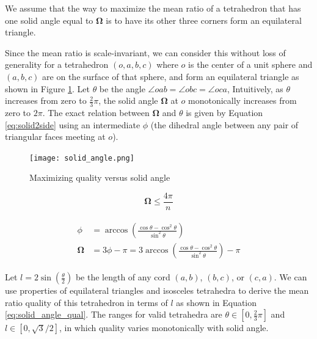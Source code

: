 We assume that the way to maximize the mean ratio of a tetrahedron
that has one solid angle equal to $\mathbf{\Omega}$ is to have
its other three corners form an equilateral triangle.

Since the mean ratio is scale-invariant, we can consider this
without loss of generality for a tetrahedron $(o,a,b,c)$ where
$o$ is the center of a unit sphere and $(a,b,c)$ are on the surface
of that sphere, and form an equilateral triangle
as shown in Figure \ref{fig:solid_angle}.
Let $\theta$ be the angle $\angle oab = \angle obc = \angle oca$,
Intuitively, as $\theta$ increases from zero to $\frac23\pi$,
the solid angle $\mathbf{\Omega}$ at $o$ monotonically
increases from zero to $2\pi$.
The exact relation between $\mathbf{\Omega}$ and $\theta$ is given by Equation
\ref{eq:solid2side}
using an intermediate $\phi$ (the dihedral angle between any pair of triangular
faces meeting at $o$).

\begin{figure}
\begin{center}
\texttt{[image: solid\_angle.png]}
\caption{Maximizing quality versus solid angle}
\label{fig:solid_angle}
\end{center}
\end{figure}

\begin{equation} \label{eq:solid_angle_degree}
\mathbf{\Omega} \leq \frac{4\pi}{n}
\end{equation}

\begin{gather} \label{eq:solid2side}
\begin{split}
\phi &= \arccos\left(\frac{\cos\theta - \cos^2\theta}{\sin^2\theta}\right) \\
\mathbf{\Omega} &= 3\phi - \pi = 3\arccos\left(\frac{\cos\theta - \cos^2\theta}{\sin^2\theta}\right) - \pi
\end{split}
\end{gather}

Let $l=2\sin\left(\frac{\theta}{2}\right)$ be the length of any cord $(a,b)$, $(b,c)$, or $(c,a)$.
We can use properties of equilateral triangles and isosceles
tetrahedra to derive the mean ratio quality of this tetrahedron
in terms of $l$ as shown in Equation \ref{eq:solid_angle_qual}.
The ranges for valid tetrahedra are $\theta\in[0,\frac23\pi]$ and $l\in[0,\sqrt{3}/2]$,
in which quality varies monotonically with solid angle.

